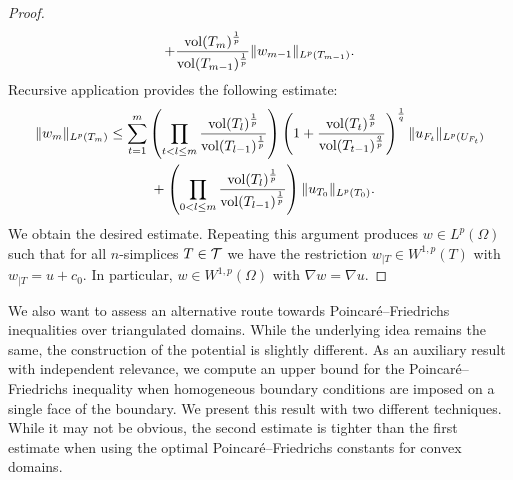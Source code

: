 \documentclass[10pt,letterpaper]{article}
\begin{document}
\begin{proof}
\begin{align*}
    +
    \frac{ \operatorname{vol}(T_m)^{\frac 1 p} }{ \operatorname{vol}(T_{{m-1}})^{\frac 1 p} }
    \| w_{m-1}\|_{L^{p}(T_{{m-1}})}
    .
 \end{align*}
 Recursive application provides the following estimate:
 \begin{align*}
    \| w_{m} \|_{L^{p}(T_m)}
    &\leq 
    \sum_{t=1}^{m} 
    \left( 
        \prod_{t < l \leq m} 
        \frac{ \operatorname{vol}(T_l)^{\frac 1 p} }{ \operatorname{vol}(T_{l-1})^{\frac 1 p} } 
    \right)
    \left( 1 + \frac{ \operatorname{vol}(T_t)^{\frac q p} }{ \operatorname{vol}(T_{t-1})^{\frac q p} } \right)^{\frac 1 q}
    \| u_{F_t} \|_{L^{p}(U_{F_t})}
    \\&\quad \quad \quad 
    +
    \left( 
        \prod_{0 < l \leq m} 
        \frac{ \operatorname{vol}(T_l)^{\frac 1 p} }{ \operatorname{vol}(T_{l-1})^{\frac 1 p} } 
    \right)
    \| u_{T_0}\|_{L^{p}(T_{0})}
    .
 \end{align*}
 We obtain the desired estimate. 
 Repeating this argument produces $w \in L^{p}(\Omega)$ 
 such that for all $n$-simplices $T \in {\mathcal T}$ we have the restriction $w_{|T} \in W^{1,p}(T)$ with $w_{|T} = u + c_{0}$.
 In particular, $w \in W^{1,p}(\Omega)$ with $\nabla w = \nabla u$.
\end{proof}








We also want to assess an alternative route towards Poincar\'e--Friedrichs inequalities over triangulated domains. 
While the underlying idea remains the same, the construction of the potential is slightly different. 
As an auxiliary result with independent relevance, we compute an upper bound for the Poincar\'e--Friedrichs inequality 
when homogeneous boundary conditions are imposed on a single face of the boundary. 
We present this result with two different techniques. 
While it may not be obvious, the second estimate is tighter than the first estimate when using the optimal Poincar\'e--Friedrichs constants for convex domains. 
\end{document}
